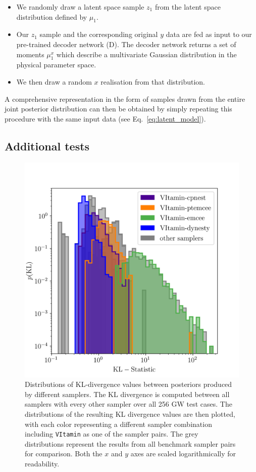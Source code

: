 \documentclass[%
showpacs,
 amsmath,amssymb,
 aps,
 twocolumn,
 prl,
 reprint,
floatfix,
]{revtex4-1}
\begin{document}
%
%
\begin{itemize}
%
\item We randomly draw a latent space sample $z_1$ from the latent space
distribution defined by $\mu_1$.
%
\item Our $z_1$ sample and the corresponding original $y$ data are fed as input to our
pre-trained decoder network (D). The decoder network returns a set of moments
$\mu^{x}_1$ which describe a multivariate Gaussian distribution in the physical
parameter space.
%
\item We then draw a random $x$ realisation from that distribution.
%
\end{itemize}
%

%
%
A comprehensive representation in the form of samples drawn from the entire joint
posterior distribution can then be obtained by simply repeating this procedure
with the same input data (see Eq.~\ref{eq:latent_model}).

%
%
\subsection{Additional tests}
%
\begin{figure}
    \includegraphics[width=\columnwidth]{images/hist-kl.png}
    \caption{\label{fig:kl_results} Distributions of \ac{KL}-divergence values
between posteriors produced by different samplers. The \ac{KL} divergence is
computed between all samplers with every other sampler over all 256 \ac{GW}
test cases. The distributions of the resulting \ac{KL} divergence values are
then plotted, with each color representing a different sampler combination
including \texttt{VItamin} as one of the sampler pairs. The grey distributions
represent the results from all benchmark sampler pairs for comparison. Both the
$x$ and $y$ axes are scaled logarithmically for readability.} 
\end{figure}
%
\end{document}
